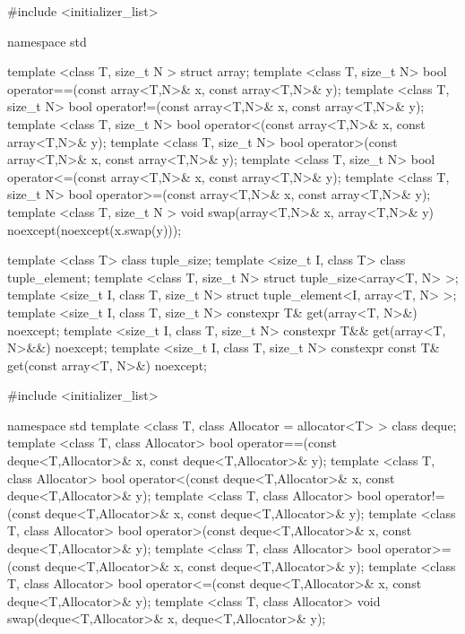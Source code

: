 %
%
\begin{codeblock}
#include <initializer_list>

namespace std {
  template <class T, size_t N > struct array;
  template <class T, size_t N>
    bool operator==(const array<T,N>& x, const array<T,N>& y);
  template <class T, size_t N>
    bool operator!=(const array<T,N>& x, const array<T,N>& y);
  template <class T, size_t N>
    bool operator<(const array<T,N>& x, const array<T,N>& y);
  template <class T, size_t N>
    bool operator>(const array<T,N>& x, const array<T,N>& y);
  template <class T, size_t N>
    bool operator<=(const array<T,N>& x, const array<T,N>& y);
  template <class T, size_t N>
    bool operator>=(const array<T,N>& x, const array<T,N>& y);
  template <class T, size_t N >
    void swap(array<T,N>& x, array<T,N>& y) noexcept(noexcept(x.swap(y)));

  template <class T> class tuple_size;
  template <size_t I, class T> class tuple_element;
  template <class T, size_t N>
    struct tuple_size<array<T, N> >;
  template <size_t I, class T, size_t N>
    struct tuple_element<I, array<T, N> >;
  template <size_t I, class T, size_t N>
    constexpr T& get(array<T, N>&) noexcept;
  template <size_t I, class T, size_t N>
    constexpr T&& get(array<T, N>&&) noexcept;
  template <size_t I, class T, size_t N>
    constexpr const T& get(const array<T, N>&) noexcept;
}
\end{codeblock}

%

\begin{codeblock}
#include <initializer_list>

namespace std {
  template <class T, class Allocator = allocator<T> > class deque;
  template <class T, class Allocator>
    bool operator==(const deque<T,Allocator>& x, const deque<T,Allocator>& y);
  template <class T, class Allocator>
    bool operator<(const deque<T,Allocator>& x, const deque<T,Allocator>& y);
  template <class T, class Allocator>
    bool operator!=(const deque<T,Allocator>& x, const deque<T,Allocator>& y);
  template <class T, class Allocator>
    bool operator>(const deque<T,Allocator>& x, const deque<T,Allocator>& y);
  template <class T, class Allocator>
    bool operator>=(const deque<T,Allocator>& x, const deque<T,Allocator>& y);
  template <class T, class Allocator>
    bool operator<=(const deque<T,Allocator>& x, const deque<T,Allocator>& y);
  template <class T, class Allocator>
    void swap(deque<T,Allocator>& x, deque<T,Allocator>& y);
}
\end{codeblock}

